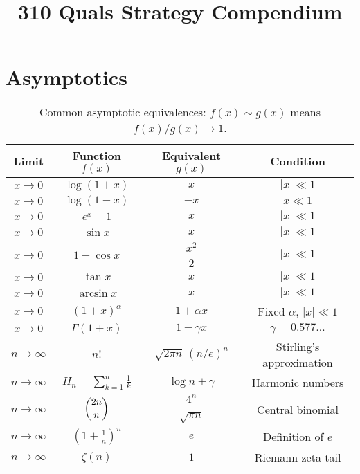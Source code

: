 \documentclass{article}
\title{310 Quals Strategy Compendium}
\begin{document}
\section{Asymptotics}
\begin{table}[ht]
\centering
\renewcommand{\arraystretch}{1.4}
\begin{tabular}{|c|c|c|c|}
\hline
\textbf{Limit} & \textbf{Function \(f(x)\)} & \textbf{Equivalent \(g(x)\)} & \textbf{Condition} \\
\hline
\(x \to 0\) & \(\log(1 + x)\) & \(x\) & \(|x| \ll 1\) \\
\(x \to 0\) & \(\log(1 - x)\) & \(-x\) & \(x \ll 1\) \\
\(x \to 0\) & \(e^x - 1\) & \(x\) & \(|x| \ll 1\) \\
\(x \to 0\) & \(\sin x\) & \(x\) & \(|x| \ll 1\) \\
\(x \to 0\) & \(1 - \cos x\) & \(\dfrac{x^2}{2}\) & \(|x| \ll 1\) \\
\(x \to 0\) & \(\tan x\) & \(x\) & \(|x| \ll 1\) \\
\(x \to 0\) & \(\arcsin x\) & \(x\) & \(|x| \ll 1\) \\
\(x \to 0\) & \((1 + x)^\alpha\) & \(1 + \alpha x\) & Fixed \(\alpha\), \(|x| \ll 1\) \\
\(x \to 0\) & \(\Gamma(1 + x)\) & \(1 - \gamma x\) & \(\gamma = 0.577\ldots\) \\
\hline
\(n \to \infty\) & \(n!\) & \(\sqrt{2\pi n}\,(n/e)^n\) & Stirling’s approximation \\
\(n \to \infty\) & \(H_n = \sum_{k=1}^n \frac{1}{k}\) & \(\log n + \gamma\) & Harmonic numbers \\
\(n \to \infty\) & \(\dbinom{2n}{n}\) & \(\dfrac{4^n}{\sqrt{\pi n}}\) & Central binomial \\
\(n \to \infty\) & \(\left(1 + \frac{1}{n}\right)^n\) & \(e\) & Definition of \(e\) \\
\(n \to \infty\) & \(\zeta(n)\) & \(1\) & Riemann zeta tail \\
\hline
\end{tabular}
\caption{Common asymptotic equivalences: \(f(x) \sim g(x)\) means \(f(x)/g(x) \to 1\).}
\end{table}
\end{document}

